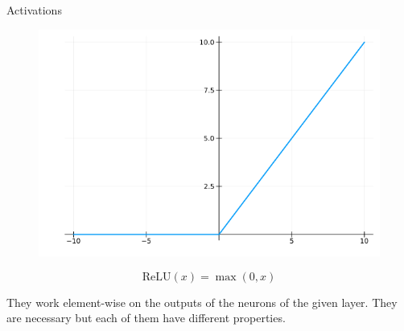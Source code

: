 \documentclass{beamer}
\begin{document}
\begin{frame}{Activations}
    \hfill
    \begin{minipage}[t]{0.3\textwidth}
        \begin{figure}
            \centering
            \includegraphics[width=\textwidth]{./images/14_relu.png}
        \end{figure}
        $$\text{ReLU}(x) = \max(0, x)$$
    \end{minipage}

    \vfill

    They work element-wise on the outputs of the neurons of the given layer.
    They are necessary but each of them have different properties.
\end{frame}
\end{document}
